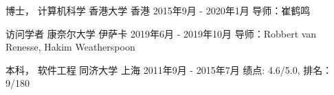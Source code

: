 

\begin{cventries}


\cventry
{博士， 计算机科学} %
{香港大学} %
{香港} %
{2015年9月 - 2020年1月} %
{ %
导师：崔鹤鸣
}


\cventry
{访问学者} %
{康奈尔大学} %
{伊萨卡} %
{2019年6月 - 2019年10月} %
{ %
导师：Robbert van Renesse, Hakim Weatherspoon
}


\cventry
{本科， 软件工程} %
{同济大学} %
{上海} %
{2011年9月 - 2015年7月} %
{ %
绩点: 4.6/5.0, 排名：9/180
}

\end{cventries}